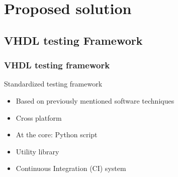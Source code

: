 \documentclass[british,10pt]{beamer}
\begin{document}
%


\section{Proposed solution}

\subsection{VHDL testing Framework}

\begin{frame}\frametitle{VHDL testing framework}
Standardized testing framework
\begin{itemize}
\item Based on previously mentioned software techniques
\item Cross platform
\item At the core: Python script
\item Utility library
\item Continuous Integration (CI) system
\end{itemize}
\end{frame}
\end{document}
